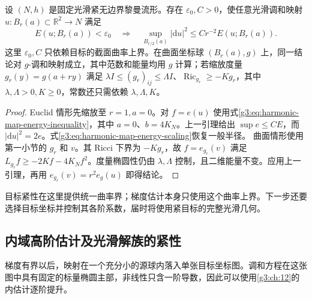 \begin{theorem}\label{g3:thm:harmonic-map-epsilon-regularity}
	设 \((N,h)\) 是固定光滑紧无边界黎曼流形。存在 \(\varepsilon_0,C>0\)，使任意光滑调和映射 \(u:B_r(a)\subset\mathbb R^2\to N\) 满足
	\begin{equation}\label{g3:eq:harmonic-map-epsilon-gradient}
		E(u;B_r(a))<\varepsilon_0
		\quad\Longrightarrow\quad
		\sup_{B_{r/2}(a)}|\mathrm du|^2\le C r^{-2}E(u;B_r(a)).
	\end{equation}
	这里 \(\varepsilon_0,C\) 只依赖目标的截面曲率上界。在曲面坐标球 \((B_r(a),g)\) 上，同一结论对 \(g\)-调和映射成立，其中范数和能量均用 \(g\) 计算；若缩放度量 \(g_r(y)=g(a+ry)\) 满足 \(\lambda I\le(g_r)_{ij}\le\Lambda I\)、\(\operatorname{Ric}_{g_r}\ge-Kg_r\)，其中 \(\lambda,\Lambda>0,K\ge0\)，常数还只需依赖 \(\lambda,\Lambda,K\)。
\end{theorem}
\begin{proof}
	Euclid 情形先缩放至 \(r=1,a=0\)。对 \(f=e(u)\) 使用式\eqref{g3:eq:harmonic-map-energy-inequality}，其中 \(a=0\)、\(b=4K_N\)。上一引理给出 \(\sup e\le CE\)，而 \(|\mathrm du|^2=2e\)。式\eqref{g3:eq:harmonic-map-energy-scaling}恢复一般半径。
	曲面情形使用第一小节的 \(g_r\) 和 \(v\)。其 Ricci 下界为 \(-K g_r\)，故 \(f=e_{g_r}(v)\) 满足 \(L_{g_r}f\ge-2Kf-4K_Nf^2\)。度量椭圆性仍由 \(\lambda,\Lambda\) 控制，且二维能量不变。应用上一引理，再用 \(e_{g_r}(v)=r^2e_g(u)\) 即得结论。
\end{proof}

目标紧性在这里提供统一曲率界；梯度估计本身只使用这个曲率上界。下一步还要选择目标坐标并控制其各阶系数，届时将使用紧目标的完整光滑几何。

\subsection{内域高阶估计及光滑解族的紧性}
\label{g3:subsec:1803:04}
梯度有界以后，映射在一个充分小的源球内落入单张目标坐标图。调和方程在这张图中具有固定的标量椭圆主部，非线性只含一阶导数，因此可以使用\cref{g3:ch:12}的内估计逐阶提升。

